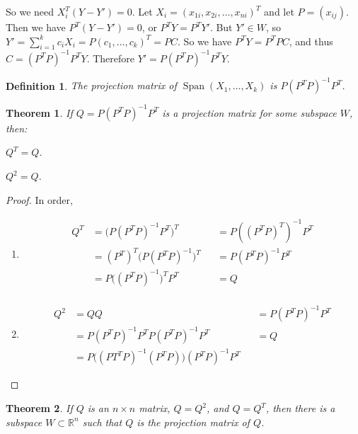 \documentclass{article}
\theoremstyle{mystyle}
\newtheorem{theorem}{Theorem}[section]
\newtheorem{definition}{Definition}[section]
\DeclareMathOperator{\Span}{Span}
\begin{document}
So we need $X_i^T(Y-Y') = 0$. Let $X_i = (x_{1i},x_{2i},\hdots, x_{ni})^{T}$ and let $P = (x_{ij})$. Then we have $P^T(Y-Y') = 0$, or $P^TY = P^T Y'$. But $Y'\in W$, so $Y' = \sum_{i=1}^{k} c_i X_i = P(c_1,\hdots, c_k)^T = PC$. So we have $P^TY = P^TPC$, and thus $C = (P^TP)^{-1}P^TY$. Therefore $Y'=P(P^TP)^{-1}P^T Y$.
\begin{definition}
The projection matrix of $\Span(X_{1},\hdots,X_{k})$ is $P(P^TP)^{-1}P^T$.
\end{definition}
\begin{theorem}
If $Q = P(P^TP)^{-1}P^T$ is a projection matrix for some subspace $W$, then:
\begin{enumerate}
    \begin{multicols}{2}
        \item $Q^T =Q$.
        \item $Q^2 = Q$.
    \end{multicols}
\end{enumerate}
\end{theorem}
\begin{proof}
In order,
\begin{enumerate}
    \item   \begin{align*}
                Q^T &= \big(P(P^TP)^{-1}P^T\big)^T & &= P((P^TP)^T)^{-1}P^T\\
                &= (P^T)^T\big(P(P^TP)^{-1}\big)^T & &= P(P^TP)^{-1}P^T\\
                &= P \big((P^TP)^{-1}\big)^TP^T & &= Q\\
        \end{align*}
    \item   \begin{align*}
                Q^2 &= QQ & &=P(P^TP)^{-1}P^T\\
                &= P(P^TP)^{-1}P^T P(P^TP)^{-1}P^T & &= Q\\
                &= P\big((PT^TP)^{-1}(P^TP)\big)(P^TP)^{-1}P^T
        \end{align*}
\end{enumerate}
\end{proof}
\begin{theorem}
If $Q$ is an $n\times n$ matrix, $Q = Q^{2}$, and $Q=Q^{T}$, then there is a subspace $W\subset \mathbb{R}^{n}$ such that $Q$ is the projection matrix of $Q$.
\end{theorem}
\end{document}
